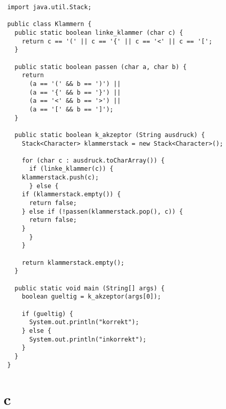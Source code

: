 \documentclass[a4paper,10pt]{article}
\begin{document}
\begin{lstlisting}
 import java.util.Stack;

 public class Klammern {
   public static boolean linke_klammer (char c) {
     return c == '(' || c == '{' || c == '<' || c == '[';
   }

   public static boolean passen (char a, char b) {
     return
       (a == '(' && b == ')') ||
       (a == '{' && b == '}') ||
       (a == '<' && b == '>') ||
       (a == '[' && b == ']');
   }

   public static boolean k_akzeptor (String ausdruck) {
     Stack<Character> klammerstack = new Stack<Character>();

     for (char c : ausdruck.toCharArray()) {
       if (linke_klammer(c)) {
	 klammerstack.push(c);
       } else {
	 if (klammerstack.empty()) {
	   return false;
	 } else if (!passen(klammerstack.pop(), c)) {
	   return false;
	 }
       }
     }

     return klammerstack.empty();
   }

   public static void main (String[] args) {
     boolean gueltig = k_akzeptor(args[0]);

     if (gueltig) {
       System.out.println("korrekt");
     } else {
       System.out.println("inkorrekt");
     }
   }
 }
\end{lstlisting}

\section*{c}
\end{document}
